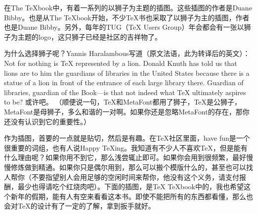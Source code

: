 在The TeXbook中，有着一系列的以狮子为主题的插图。这些插图的作者是Duane Bibby。也是从The TeXbook开始，不少TeX书也采取了以狮子为主的插图，作者也是Duane Bibby。另外，每年的TUG（TeX Users Group）年会都会有一张以狮子为主题的logo，这只狮子已经是社区的吉祥物了。

为什么选择狮子呢？Yannis Haralambous写道（原文法语，此为转译后的英文）：Not for nothing is TeX represented by a lion. Donald Knuth has told us that lions are to him the guardians of libraries in the United States because there is a statue of a lion in front of the entrance of each large library there. Guardian of libraries, guardian of the Book—is that not indeed what TeX ultimately aspires to be? 或许吧。 （顺便说一句，TeX和MetaFont都用了狮子，TeX是公狮子，MetaFont是母狮子，多么和谐的一对啊。如果你还是忽略MetaFont的存在，那你还没有认识到它的重要性。）

作为插图，首要的一点就是贴切，然后是有趣。在TeX社区里面，have fun是一个很重要的词组，也有人说Happy TeXing。我知道有不少人不喜欢TeX，但是能有什么理由呢？如果你用不到它，那么浅尝辄止即可。如果你会用到很频繁，最好慢慢修炼做到精通。如果你只是偶尔用到，那么可以搬个模版什么的，甚至也可以找人帮你（不要指望别人会用足够的空闲时间来帮你，他没有这个义务，请支付报酬，最少也得请吃个红烧肉吧）。下面的插图，是TeX TeXbook中的，我也希望这个新年的假期，能有人有空来看看这本书。即使不能把所有的东西都看懂，那么也会对TeX的设计有了一定的了解，拿到扳手就好。

